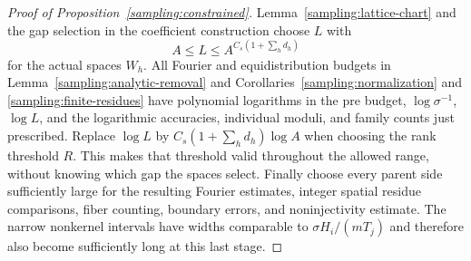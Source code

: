 \begin{proof}[Proof of Proposition~\ref{sampling:constrained}]
Lemma~\ref{sampling:lattice-chart} and the gap selection in the
coefficient construction choose $L$ with
\[
 A\le L\le A^{C_s(1+\sum_hd_h)}
\]
for the actual spaces $W_h$.  All Fourier and equidistribution budgets
in Lemma~\ref{sampling:analytic-removal} and
Corollaries~\ref{sampling:normalization} and
\ref{sampling:finite-residues} have polynomial logarithms in the pre
budget, $\log\sigma^{-1}$, $\log L$, and the logarithmic accuracies,
individual moduli, and family counts just prescribed.  Replace
$\log L$ by $C_s(1+\sum_hd_h)\log A$ when choosing the rank threshold
$R$.  This makes that threshold valid throughout the allowed range,
without knowing which gap the spaces select.  Finally choose every
parent side sufficiently large for the resulting Fourier estimates,
integer spatial residue comparisons, fiber counting, boundary errors,
and noninjectivity estimate.  The narrow nonkernel intervals have widths
comparable to $\sigma H_i/(mT_j)$ and therefore also become sufficiently
long at this last stage.


\end{proof}
